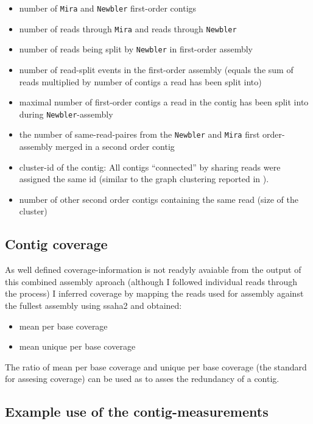 \begin{itemize}
\item number of \texttt{Mira} and \texttt{Newbler} first-order contigs
\item number of reads through \texttt{Mira} and reads through \texttt{Newbler}
\item number of reads being split by \texttt{Newbler} in first-order
  assembly 
\item number of read-split events in the first-order assembly (equals
  the sum of reads multiplied by number of contigs a read has been
  split into)
\item maximal number of first-order contigs a read in the contig has
  been split into during \texttt{Newbler}-assembly 
\item the number of same-read-paires from the \texttt{Newbler} and
  \texttt{Mira} first order-assembly merged in a second order contig
\item cluster-id of the contig: All contigs ``connected'' by sharing
  reads were assigned the same id (similar to the graph clustering
  reported in \cite{pmid21138572}).
\item number of other second order contigs containing the same read
  (size of the cluster)
\end{itemize}


\subsection{Contig coverage}

As well defined coverage-information is not readyly avaiable from the
output of this combined assembly aproach (although I followed
individual reads through the process) I inferred coverage by mapping
the reads used for assembly against the fullest assembly using ssaha2
\cite{pmid11591649} and obtained:

\begin{itemize}
\item mean per base coverage
\item mean unique per base coverage
\end{itemize}

The ratio of mean per base coverage and unique per base coverage (the
standard for assesing coverage) can be used as to asses the redundancy
of a contig.

\subsection{Example use of the contig-measurements}

